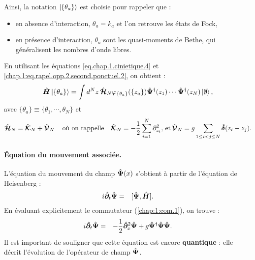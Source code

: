 Ainsi, la notation $\ket{\{\theta_a \}}$  est choisie pour rappeler que :
\begin{itemize}[label = $\bullet$]
	\item en absence d’interaction, $\theta_a = k_a$ et l’on retrouve les états de Fock,
	\item en présence d’interaction, $\theta_a$ sont les quasi-moments de Bethe, qui généralisent les nombres d’onde libres.
\end{itemize}

\medskip

En utilisant les équations \eqref{eq.chap.1.cinietique.4} et \eqref{chap.1:eq.rapel.opp.2.second.ponctuel.2}, on obtient : 
\begin{eqnarray}\label{chap.1:eq.LL.champ.2}
	\hat{\bm{H}}\ket{\{\theta_a\}} =  \int d^Nz \, \hat{\bm{\mathcal{H}}}_N \varphi_{\{\theta_a\}}(\{z_a\})\hat{\bm{\Psi}}^\dag(z_1)\cdots \hat{\bm{\Psi}}^\dag(z_N) \ket{\emptyset}, 
\end{eqnarray}
avec $\{\theta_a\} \equiv \{ \theta_1 , \cdots , \theta_N \} $ et
\begin{eqnarray}\label{chap.1:eq.LL.eta.1}
\hat{\bm{\mathcal{H}}}_N  =  \hat{\bm{\mathcal{K}}}_N  +  \hat{\bm{\mathcal{V}}}_N \, \quad \mbox{où on rappelle} \quad \hat{\bm{\mathcal{K}}}_N = -\frac{1}2\sum_{i=1}^N \partial_{z_i}^2 , \,  \mbox{et} \, 	\hat{\bm{\mathcal{V}}}_N = g\sum_{1\leq i < j \leq N } \hat{\bm{\delta}}(z_i - z_j)	. 
\end{eqnarray}





\paragraph{Équation du mouvement associée.}

L’équation du mouvement du champ \( \hat{\bm{\Psi}}(x) \) s'obtient à partir de l’équation de Heisenberg :
\begin{eqnarray}\label{chap.1:eq.GP.1}
	i\hat{\bm{\partial}}_t	\hat{\bm{\Psi}} & = & [ \hat{\bm{\Psi}} , \hat{\bm{H}} ].
\end{eqnarray}
En évaluant explicitement le commutateur (\ref{chap:1:com.1}), on trouve :
\begin{eqnarray}
	i \hat{\bm{\partial}}_t \hat{\bm{\Psi}}	 & = & - \frac{1}{2}\hat{\bm{\partial}}_x^2 \hat{\bm{\Psi}} + g \hat{\bm{\Psi}}^\dag\hat{\bm{\Psi}} \hat{\bm{\Psi}}.
\end{eqnarray}
Il est important de souligner que cette équation est encore {\bf quantique} : elle décrit l’évolution de l’opérateur de champ $\hat{\bm{\Psi}}$.

